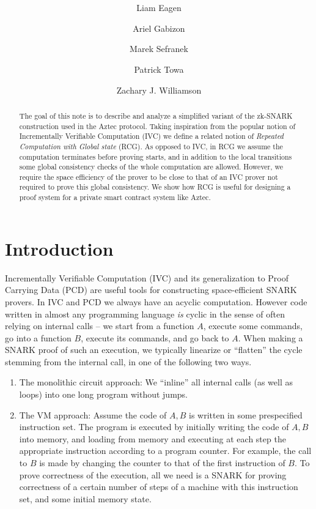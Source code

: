 \documentclass[11pt]{article} %
\title{ \papertitle \\[0.72cm]}
\author[1]{Liam Eagen}
\author[2]{Ariel Gabizon}
\author[3]{Marek Sefranek}
\author[2]{Patrick Towa}
\author[2]{Zachary J. Williamson}
\affil[1]{Alpen Labs}
\affil[2]{Aztec Labs}
\affil[3]{TU Wien}
\begin{document}
    \maketitle
\begin{abstract}
The goal of this note is to describe and analyze a simplified variant of the zk-SNARK construction used in the Aztec protocol.
Taking inspiration from the popular notion of Incrementally Verifiable Computation\cite{ivc} (IVC)
we define a related notion of \emph{Repeated Computation with Global state} (RCG). As opposed to IVC, in RCG we assume the computation terminates before proving starts, and in addition to the local transitions some global consistency checks of the whole computation are allowed. However, we require the space efficiency of the prover to be close to that of an IVC prover not required to prove this global consistency.
We show how RCG is useful for designing a proof system for a private smart contract system like Aztec.
\end{abstract}
\section{Introduction}
Incrementally Verifiable Computation (IVC) \cite{ivc} and its generalization to Proof Carrying Data (PCD) \cite{pcd} are useful tools for constructing space-efficient SNARK provers\cite{BCCT}.
In IVC and PCD we always have an acyclic computation.
However code written in almost any programming language \emph{is} cyclic in the sense of often relying on internal calls --
we start from a function $A$, execute some commands, go into a function $B$, execute its commands, and go back to $A$.
When making a SNARK proof of such an execution, we typically linearize or ``flatten'' the cycle stemming from the internal call, in one of the following two ways.
\begin{enumerate}
 \item The monolithic circuit approach: We ``inline'' all internal calls (as well as loops) into one long program without jumps.
 \item The VM approach: Assume the code of $A,B$ is written in some prespecified instruction set. The program is executed by initially writing the code of $A,B$ into memory, and loading from memory and executing at each step the appropriate instruction according to a program counter. For example, the call to $B$ is made by changing the counter to that of the first instruction of $B$. To prove correctness of the execution, all we need is a SNARK for proving correctness of a certain number of steps of a machine with this instruction set, and some initial memory state.
\end{enumerate}
\end{document}
